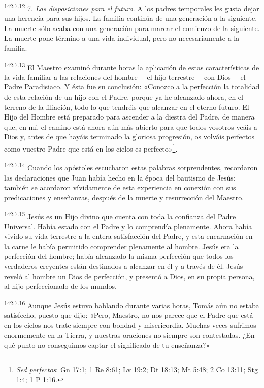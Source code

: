 \par
\textsuperscript{142:7.12} 7. \textit{Las disposiciones para el futuro}. A los padres temporales les gusta dejar una herencia para sus hijos. La familia continúa de una generación a la siguiente. La muerte sólo acaba con una generación para marcar el comienzo de la siguiente. La muerte pone término a una vida individual, pero no necesariamente a la familia.

\par
\textsuperscript{142:7.13} El Maestro examinó durante horas la aplicación de estas características de la vida familiar a las relaciones del hombre ---el hijo terrestre--- con Dios ---el Padre Paradisiaco. Y ésta fue su conclusión: «Conozco a la perfección la totalidad de esta relación de un hijo con el Padre, porque ya he alcanzado ahora, en el terreno de la filiación, todo lo que tendréis que alcanzar en el eterno futuro. El Hijo del Hombre está preparado para ascender a la diestra del Padre, de manera que, en mí, el camino está ahora aún más abierto para que todos vosotros veáis a Dios y, antes de que hayáis terminado la gloriosa progresión, os volváis perfectos como vuestro Padre que está en los cielos es perfecto»\footnote{\textit{Sed perfectos}: Gn 17:1; 1 Re 8:61; Lv 19:2; Dt 18:13; Mt 5:48; 2 Co 13:11; Stg 1:4; 1 P 1:16.}.

\par
\textsuperscript{142:7.14} Cuando los apóstoles escucharon estas palabras sorprendentes, recordaron las declaraciones que Juan había hecho en la época del bautismo de Jesús; también se acordaron vívidamente de esta experiencia en conexión con sus predicaciones y enseñanzas, después de la muerte y resurrección del Maestro.

\par
\textsuperscript{142:7.15} Jesús es un Hijo divino que cuenta con toda la confianza del Padre Universal. Había estado con el Padre y lo comprendía plenamente. Ahora había vivido su vida terrestre a la entera satisfacción del Padre, y esta encarnación en la carne le había permitido comprender plenamente al hombre. Jesús era la perfección del hombre; había alcanzado la misma perfección que todos los verdaderos creyentes están destinados a alcanzar en él y a través de él. Jesús reveló al hombre un Dios de perfección, y presentó a Dios, en su propia persona, al hijo perfeccionado de los mundos.

\par
\textsuperscript{142:7.16} Aunque Jesús estuvo hablando durante varias horas, Tomás aún no estaba satisfecho, puesto que dijo: «Pero, Maestro, no nos parece que el Padre que está en los cielos nos trate siempre con bondad y misericordia. Muchas veces sufrimos enormemente en la Tierra, y nuestras oraciones no siempre son contestadas. ¿En qué punto no conseguimos captar el significado de tu enseñanza?»

